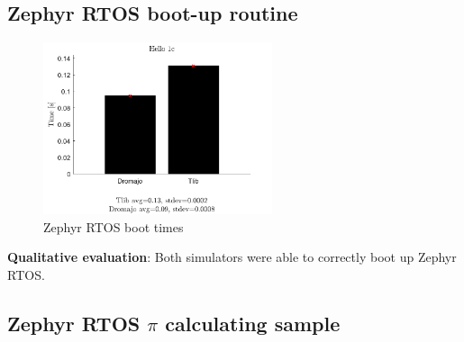 \subsection{Zephyr RTOS boot-up routine}

\begin{figure}[h]
	\centering
	\includegraphics[width=0.6\textwidth]{figures/benchmarks/Hello1c.pdf}
	\caption{Zephyr RTOS boot times}
\end{figure}
\noindent
\textbf{Qualitative evaluation}: Both simulators were able to correctly boot up Zephyr RTOS.
\vspace*{15px}

\subsection{Zephyr RTOS $\pi$ calculating sample}

